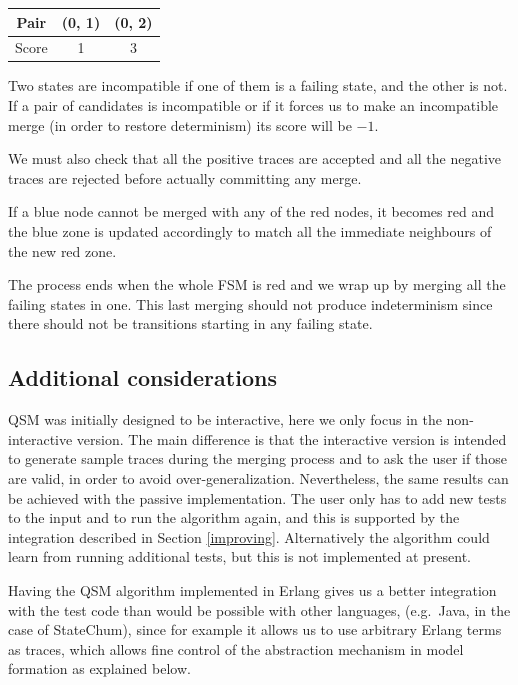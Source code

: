 \documentclass[]{sigplanconf}
\begin{document}
\begin{center}
\begin{tabular}{c||c|c}
Pair & (0, 1) & (0, 2)\\\hline\hline
Score & 1 & 3
\end{tabular}
\end{center}

Two states are incompatible if one of them is a failing state, and
the other is not. If a pair of candidates is incompatible or if
it forces us to make an incompatible merge (in order to restore determinism)
its score will be $-1$.

We must also check that all the positive traces are accepted and
all the negative traces are rejected before actually committing
any merge.

If a blue node cannot be merged with any of the red nodes,
it becomes red and the blue zone is updated accordingly to
match all the immediate neighbours of the new red zone.

The process ends when the whole FSM is red and we wrap up by
merging all the failing states in one. This last merging should
not produce indeterminism since there should not be transitions
starting in any failing state.

\subsection{Additional considerations}

QSM was initially designed to be interactive, here we only
focus in the non-interactive version. The main difference is that the interactive
version is intended to generate sample traces during the merging process and to ask
the user if those are valid, in order to avoid over-generalization.
Nevertheless, the same results can be achieved with the passive
implementation. The user only has to add new tests to the input
and to run the algorithm again, and this is supported by the integration described in Section \ref{improving}. Alternatively
the algorithm could learn from running additional tests, but this is not implemented at present. 

Having the QSM algorithm implemented in Erlang
gives us a better integration with the test code than would be possible with other languages, (e.g.\ Java, in the case of StateChum), since for
example it allows us to use arbitrary Erlang terms as traces, which allows fine control of the abstraction mechanism in model formation as explained below.
\end{document}
